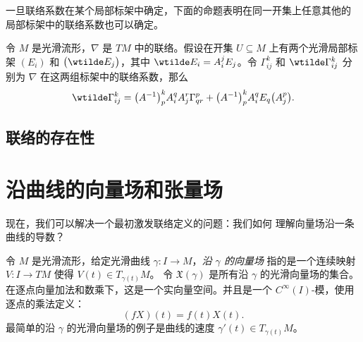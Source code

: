 \documentclass[fontset=none]{Notes}
\begin{document}
一旦联络系数在某个局部标架中确定，下面的命题表明在同一开集上任意其他的
局部标架中的联络系数也可以确定。

\begin{proposition}[联络系数的变换法则]
  令 $M$ 是光滑流形，$\nabla$ 是 $TM$ 中的联络。假设在开集 $U\subseteq M$
  上有两个光滑局部标架 $(E_i)$ 和 $\bigl(\wtilde E_j\bigr)$，其中
  $\wtilde E_i=A_i^jE_j$。令 $\Gamma_{ij}^k$ 和 $\wtilde\Gamma_{ij}^k$
  分别为 $\nabla$ 在这两组标架中的联络系数，那么 
  \begin{equation}
    \wtilde \Gamma_{ij}^k=\bigl(A^{-1}\bigr)_p^kA_i^qA_j^r\Gamma_{qr}^p
    +\bigl(A^{-1}\bigr)_p^kA_i^qE_q\bigl(A_j^p\bigr).
  \end{equation}
\end{proposition}

\subsection{联络的存在性}


\section{沿曲线的向量场和张量场}

现在，我们可以解决一个最初激发联络定义的问题：我们如何
理解向量场沿一条曲线的导数？

令 $M$ 是光滑流形，给定光滑曲线 $\gamma:I\to M$，\emph{沿 $\gamma$ 的向量场}
指的是一个连续映射 $V:I\to TM$ 使得 $V(t)\in T_{\gamma(t)}M$。
令 $\mathfrak{X}(\gamma)$ 是所有沿 $\gamma$ 的光滑向量场的集合。
在逐点向量加法和数乘下，这是一个实向量空间。并且是一个
$C^\infty(I)$-模，使用逐点的乘法定义：
\[
  (fX)(t)=f(t)X(t).  
\]
最简单的沿 $\gamma$ 的光滑向量场的例子是曲线的速度
$\gamma'(t)\in T_{\gamma(t)}M$。
\end{document}
